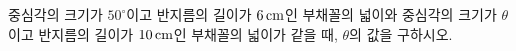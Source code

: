 중심각의 크기가 $50^\circ$이고 반지름의 길이가 $6\mkern3mu \mathrm{cm}$인 부채꼴의 넓이와 중심각의 크기가 $\theta$이고 반지름의 길이가 $10\mkern3mu \mathrm{cm}$인 부채꼴의 넓이가 같을 때, $\theta$의 값을 구하시오. 
